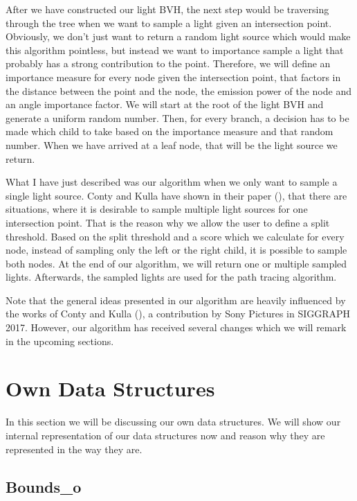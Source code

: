 After we have constructed our light BVH, the next step would be traversing through the tree when we want to sample a light given an intersection point. Obviously, we don't just want to return a random light source which would make this algorithm pointless, but instead we want to importance sample a light that probably has a strong contribution to the point. Therefore, we will define an importance measure for every node given the intersection point, that factors in the distance between the point and the node, the emission power of the node and an angle importance factor. We will start at the root of the light BVH and generate a uniform random number. Then, for every branch, a decision has to be made which child to take based on the importance measure and that random number. When we have arrived at a leaf node, that will be the light source we return.

What I have just described was our algorithm when we only want to sample a single light source. Conty and Kulla have shown in their paper (\cite{MLS}), that there are situations, where it is desirable to sample multiple light sources for one intersection point. That is the reason why we allow the user to define a split threshold. Based on the split threshold and a score which we calculate for every node, instead of sampling only the left or the right child, it is possible to sample both nodes. At the end of our algorithm, we will return one or multiple sampled lights. Afterwards, the sampled lights are used for the path tracing algorithm.

Note that the general ideas presented in our algorithm are heavily influenced by the works of Conty and Kulla (\cite{MLA,MLS}), a contribution by Sony Pictures in SIGGRAPH 2017. However, our algorithm has received several changes which we will remark in the upcoming sections.

\section{Own Data Structures}
\label{sec:alg:ows}

In this section we will be discussing our own data structures. We will show our internal representation of our data structures now and reason why they are represented in the way they are.

\subsection{Bounds\_o}

